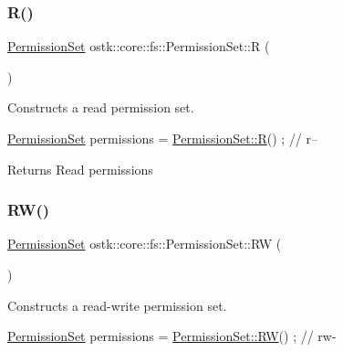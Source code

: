 \subsubsection{\texorpdfstring{R()}{R()}}
{\footnotesize\ttfamily \hyperlink{classostk_1_1core_1_1fs_1_1_permission_set}{Permission\+Set} ostk\+::core\+::fs\+::\+Permission\+Set\+::R (\begin{DoxyParamCaption}{ }\end{DoxyParamCaption})\hspace{0.3cm}{\ttfamily [static]}}



Constructs a read permission set. 


\begin{DoxyCode}
\hyperlink{classostk_1_1core_1_1fs_1_1_permission_set_a31c918014e874ceac487e92d0d3ac5a2}{PermissionSet} permissions = \hyperlink{classostk_1_1core_1_1fs_1_1_permission_set_a400f8be607966c0a42597f5cef062210}{PermissionSet::R}() ; \textcolor{comment}{// r--}
\end{DoxyCode}


\begin{DoxyReturn}{Returns}
Read permissions 
\end{DoxyReturn}
\mbox{\label{classostk_1_1core_1_1fs_1_1_permission_set_ad58bc0911ca89d3c03c089f1647d0315}} 
\subsubsection{\texorpdfstring{R\+W()}{RW()}}
{\footnotesize\ttfamily \hyperlink{classostk_1_1core_1_1fs_1_1_permission_set}{Permission\+Set} ostk\+::core\+::fs\+::\+Permission\+Set\+::\+RW (\begin{DoxyParamCaption}{ }\end{DoxyParamCaption})\hspace{0.3cm}{\ttfamily [static]}}



Constructs a read-\/write permission set. 


\begin{DoxyCode}
\hyperlink{classostk_1_1core_1_1fs_1_1_permission_set_a31c918014e874ceac487e92d0d3ac5a2}{PermissionSet} permissions = \hyperlink{classostk_1_1core_1_1fs_1_1_permission_set_ad58bc0911ca89d3c03c089f1647d0315}{PermissionSet::RW}() ; \textcolor{comment}{// rw-}
\end{DoxyCode}


